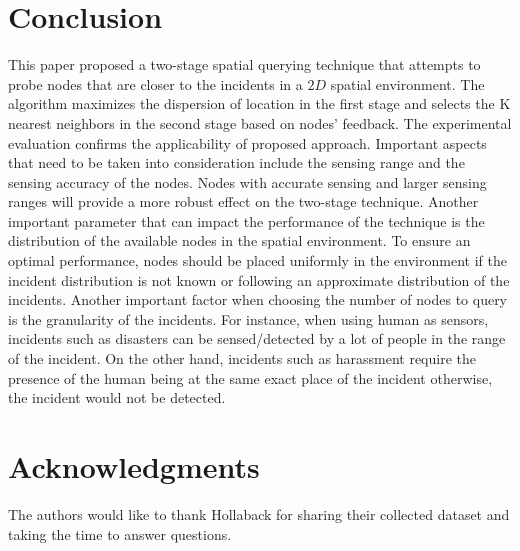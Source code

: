 \documentclass{acm_proc_article-sp}
\begin{document}
\section{Conclusion}
This paper proposed a two-stage spatial querying technique that attempts to probe nodes that are closer to the incidents in a $2D$ spatial environment. The algorithm maximizes the dispersion of location in the first stage and selects the K nearest neighbors in the second stage based on nodes' feedback. The experimental evaluation confirms the applicability of proposed approach.
Important aspects that need to be taken into consideration include the sensing range and the sensing accuracy of the nodes. Nodes with accurate sensing and larger sensing ranges will provide a more robust effect on the two-stage technique. Another important parameter that can impact the performance of the technique is the distribution of the available nodes in the spatial environment. To ensure an optimal performance, nodes should be placed uniformly in the environment if the incident distribution is not known or following an approximate distribution of the incidents. Another important factor when choosing the number of nodes to query is the granularity of the incidents. For instance, when using human as sensors, incidents such as disasters can be sensed/detected by a lot of people in the range of the incident. On the other hand, incidents such as harassment require the presence of the human being at the same exact place of the incident otherwise, the incident would not be detected.

\section{Acknowledgments}
The authors would like to thank Hollaback for sharing their collected dataset and taking the time to answer questions.


{\footnotesize
}  %
%
%
\end{document}
